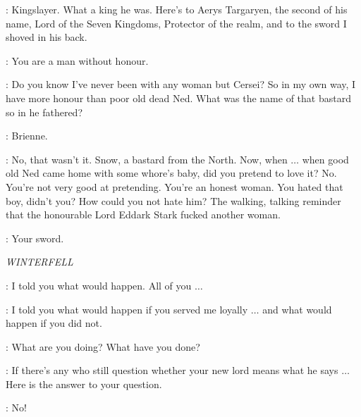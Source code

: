 \JAIME: Kingslayer. What a king he was. Here's to Aerys Targaryen, the second of his name, Lord of the Seven Kingdoms, Protector of the realm, and to the sword I shoved in his back.

\CATELYN: You are a man without honour.

\JAIME: Do you know I've never been with any woman but Cersei? So in my own way, I have more honour than poor old dead Ned. What was the name of that bastard so in he fathered?

\CATELYN: Brienne.


\JAIME: No, that wasn't it. Snow, a bastard from the North. Now, when $\ldots$ when good old Ned came home with some whore's baby, did you pretend to love it? No. You're not very good at pretending. You're an honest woman. You hated that boy, didn't you? How could you not hate him? The walking, talking reminder that the honourable Lord Eddark Stark fucked another woman.

\CATELYN:  Your sword.



\scene

\textit{WINTERFELL}


\THEON: I told you what would happen. All of you $\ldots$


\THEON: I told you what would happen if you served me loyally $\ldots$ and what would happen if you did not.

\LUWIN: What are you doing? What have you done?

\THEON: If there's any who still question whether your new lord means what he says $\ldots$ Here is the answer to your question.


\LUWIN: No!


